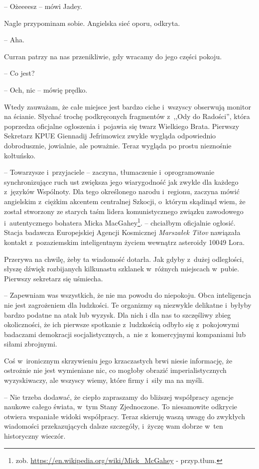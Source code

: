 \documentclass[oneside,polish,12pt,sfheadings]{mwbk}
\begin{document}
-- Ożeeeesz -- mówi Jadey.

Nagle przypominam sobie. Angielska sieć oporu, odkryta.

-- Aha.

Curran patrzy na nas przenikliwie, gdy wracamy do jego części pokoju. 

-- Co jest?

-- Och, nic -- mówię prędko.

Wtedy zauważam, że całe miejsce jest bardzo ciche i~wszyscy obserwują
monitor na ścianie. Słychać trochę podkręconych fragmentów z~,,Ody do
Radości'', która poprzedza oficjalne ogłoszenia i~pojawia się twarz
Wielkiego Brata. Pierwszy Sekretarz KPUE Giennadij Jefrimowicz zwykle
wygląda odpowiednio dobrodusznie, jowialnie, ale poważnie. Teraz wygląda
po prostu nieznośnie kołtuńsko.

-- Towarzysze i~przyjaciele -- zaczyna, tłumaczenie i~oprogramowanie
synchronizujące ruch ust zwiększa jego wiarygodność jak zwykle dla
każdego z~języków Wspólnoty. Dla tego określonego narodu i~regionu,
zaczyna mówić angielskim z~ciężkim akcentem centralnej Szkocji, o~którym
skądinąd wiem, że został stworzony ze starych taśm lidera
komunistycznego związku zawodowego i~autentycznego bohatera Micka
MacGahey\footnote{zob. \url{https://en.wikipedia.org/wiki/Mick_McGahey} - przyp.tłum.}. -- chciałbym oficjalnie ogłosić. Stacja badawcza Europejskiej
Agencji Kosmicznej \emph{Marszałek Titov} nawiązała kontakt z~pozaziemskim inteligentnym życiem wewnątrz asteroidy 10049 Lora.

Przerywa na chwilę, żeby ta wiadomość dotarła. Jak gdyby z~dużej
odległości, słyszę dźwięk rozbijanych kilkunastu szklanek w~różnych
miejscach w~pubie. Pierwszy sekretarz się uśmiecha.

-- Zapewniam was wszystkich, że nie ma powodu do niepokoju. Obca
inteligencja nie jest zagrożeniem dla ludzkości. Te organizmy są
niezwykle delikatne i~byłyby bardzo podatne na atak lub wyzysk. Dla nich
i dla nas to szczęśliwy zbieg okoliczności, że ich pierwsze spotkanie z~ludzkością odbyło się z~pokojowymi badaczami demokracji
socjalistycznych, a~nie z~komercyjnymi kompaniami lub siłami zbrojnymi.

Coś w~ironicznym skrzywieniu jego krzaczastych brwi niesie informację,
że ostrożnie nie jest wymieniane nic, co mogłoby obrazić
imperialistycznych wyzyskiwaczy, ale wszyscy wiemy, które firmy i~siły ma
na myśli.

-- Nie trzeba dodawać, że ciepło zapraszamy do bliższej współpracy
agencje naukowe całego świata, w~tym Stany Zjednoczone. To niesamowite
odkrycie otwiera wspaniałe widoki współpracy. Teraz skieruję waszą uwagę
do zwykłych wiadomości przekazujących dalsze szczegóły, i~życzę wam
dobrze w~ten historyczny wieczór.
\end{document}
